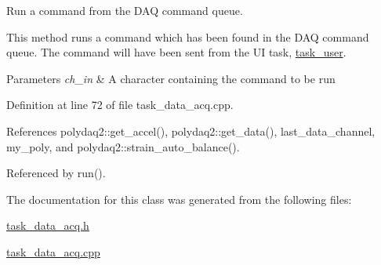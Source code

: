 Run a command from the D\-A\-Q command queue. 

This method runs a command which has been found in the D\-A\-Q command queue. The command will have been sent from the U\-I task, {\ttfamily \hyperlink{classtask__user}{task\-\_\-user}}. 
\begin{DoxyParams}{Parameters}
{\em ch\-\_\-in} & A character containing the command to be run \\
\hline
\end{DoxyParams}


Definition at line 72 of file task\-\_\-data\-\_\-acq.\-cpp.



References polydaq2\-::get\-\_\-accel(), polydaq2\-::get\-\_\-data(), last\-\_\-data\-\_\-channel, my\-\_\-poly, and polydaq2\-::strain\-\_\-auto\-\_\-balance().



Referenced by run().



The documentation for this class was generated from the following files\-:\begin{DoxyCompactItemize}
\item 
\hyperlink{task__data__acq_8h}{task\-\_\-data\-\_\-acq.\-h}\item 
\hyperlink{task__data__acq_8cpp}{task\-\_\-data\-\_\-acq.\-cpp}\end{DoxyCompactItemize}
